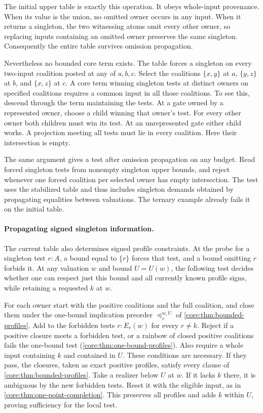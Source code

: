 The initial upper table is exactly this operation.
It obeys whole-input provenance. When its value is
the union, no omitted owner occurs in any input.
When it returns a singleton, the two witnessing
atoms omit every other owner, so replacing inputs
containing an omitted owner preserves the same
singleton. Consequently the entire table survives
omission propagation.

Nevertheless no bounded core term exists. The table
forces a singleton on every two-input coalition
posted at any of $a,b,c$. Select the coalitions
$\{x,y\}$ at $a$, $\{y,z\}$ at $b$, and $\{x,z\}$
at $c$. A core term winning singleton tests at distinct
owners on specified coalitions requires a common
input in all those coalitions. To see this, descend
through the term maintaining the tests. At a gate
owned by a represented owner, choose a child winning
that owner's test. For every other owner both children
must win its test. At an unrepresented gate either
child works. A projection meeting all tests must lie
in every coalition. Here their intersection is empty.

The same argument gives a test after omission
propagation on any budget. Read forced singleton
tests from nonempty singleton upper bounds, and
reject whenever one forced coalition per selected
owner has empty intersection. The test uses the
stabilized table and thus includes singleton demands
obtained by propagating equalities between
valuations. The ternary example already fails it
on the initial table.

\paragraph{Propagating signed singleton information.}
The current table also determines signed profile
constraints. At the probe for a singleton test
$r:A$, a bound equal to $\{r\}$ forces that test,
and a bound omitting $r$ forbids it. At any
valuation $w$ and bound $U=U(w)$, the following
test decides whether one can respect just this
bound and all currently known profile signs,
while retaining a requested $k$ at $w$.

For each owner start with the positive coalitions
and the full coalition, and close them under the
one-bound implication preorder
$\preceq_r^{w,U}$ of
\cref{core:thm:bounded-profiles}.
Add to the forbidden tests $r:E_r(w)$ for every
$r\ne k$. Reject if a positive closure meets a
forbidden test, or a rainbow of closed positive
coalitions fails the one-bound test
(\cref{core:thm:one-bound-profiles}).
Also require a whole input containing $k$ and
contained in $U$. These conditions are necessary.
If they pass, the closures, taken as exact
positive profiles, satisfy every clause of
\cref{core:thm:bounded-profiles}. Take a realizer
below $U$ at $w$. If it lacks $k$ there, it is
ambiguous by the new forbidden tests. Reset it
with the eligible input, as in
\cref{core:thm:one-point-completion}. This
preserves all profiles and adds $k$ within $U$,
proving sufficiency for the local test.

